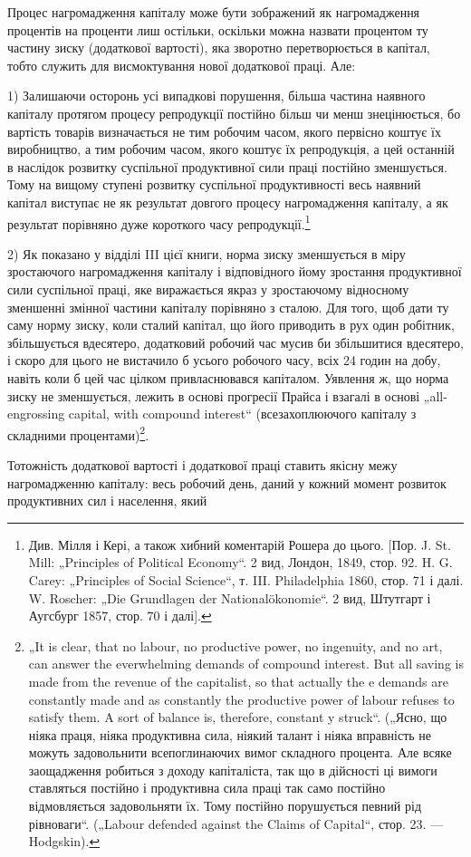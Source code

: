 Процес нагромадження капіталу може бути зображений як
нагромадження процентів на проценти лиш остільки, оскільки
можна назвати процентом ту частину зиску (додаткової вартості),
яка зворотно перетворюється в капітал, тобто служить для висмоктування
нової додаткової праці. Але:

1) Залишаючи осторонь усі випадкові порушення, більша частина
наявного капіталу протягом процесу репродукції постійно
більш чи менш знецінюється, бо вартість товарів визначається
не тим робочим часом, якого первісно коштує їх виробництво,
а тим робочим часом, якого коштує їх репродукція, а цей останній
в наслідок розвитку суспільної продуктивної сили праці постійно
зменшується. Тому на вищому ступені розвитку суспільної
продуктивності весь наявний капітал виступає не як результат
довгого процесу нагромадження капіталу, а як результат
порівняно дуже короткого часу репродукції.\footnote{
Див. Мілля і Кері, а також хибний коментарій Рошера до цього. [Пор.
J. St. Mill: „Principles of Political Economy“. 2 вид, Лондон, 1849, стор. 92. H. G.
Carey: „Principles of Social Science“, т. III. Philadelphia 1860, стор. 71 і далі.
W. Roscher: „Die Grundlagen der Nationalökonomie“. 2 вид, Штутгарт і Аугсбург
1857, стор. 70 і далі].
}

2) Як показано у відділі III цієї книги, норма зиску зменшується
в міру зростаючого нагромадження капіталу і відповідного
йому зростання продуктивної сили суспільної праці, яке
виражається якраз у зростаючому відносному зменшенні змінної
частини капіталу порівняно з сталою. Для того, щоб дати ту
саму норму зиску, коли сталий капітал, що його приводить в рух
один робітник, збільшується вдесятеро, додатковий робочий час
мусив би збільшитися вдесятеро, і скоро для цього не вистачило
б усього робочого часу, всіх 24 годин на добу, навіть
коли б цей час цілком привласнювався капіталом. Уявлення ж, що
норма зиску не зменшується, лежить в основі прогресії Прайса
і взагалі в основі „all-engrossing capital, with compound interest“
(всезахоплюючого капіталу з складними процентами)\footnote{
„It is clear, that no labour, no productive power, no ingenuity, and no art,
can answer the everwhelming demands of compound interest. But all saving is
made from the revenue of the capitalist, so that actually the e demands are constantly
made and as constantly the productive power of labour refuses to satisfy
them. A sort of balance is, therefore, constant y struck“. („Ясно, що ніяка праця,
ніяка продуктивна сила, ніякий талант і ніяка вправність не можуть задовольнити
всепоглинаючих вимог складного процента. Але всяке заощадження робиться з
доходу капіталіста, так що в дійсності ці вимоги ставляться постійно і продуктивна сила праці так
само постійно відмовляється задовольняти їх. Тому
постійно порушується певний рід рівноваги“. („Labour defended against the Claims
of Capital“, стор. 23. — Hodgskin).
}.

Тотожність додаткової вартості і додаткової праці ставить
якісну межу нагромадженню капіталу: весь робочий день, даний
у кожний момент розвиток продуктивних сил і населення, який
\parbreak{}  %
